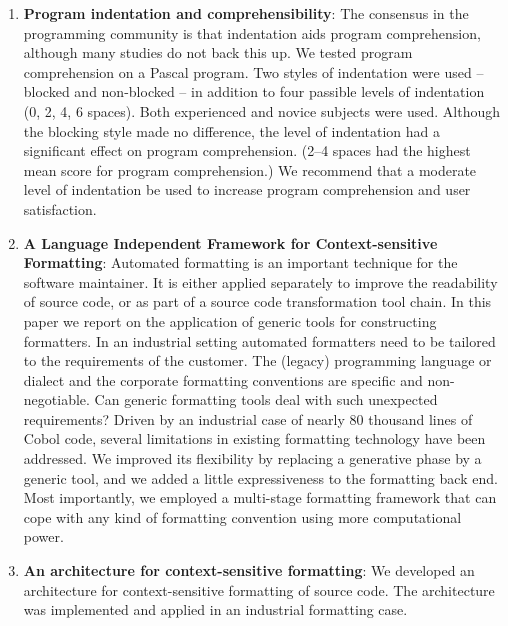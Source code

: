 \begin{englishtext}
\begin{enumerate}
    \item \textbf{Program indentation and comprehensibility}: The consensus in the
    programming community is that indentation aids program comprehension,
    although many studies do not back this up. We tested program comprehension
    on a Pascal program. Two styles of indentation were used -- blocked and
    non-blocked -- in addition to four passible levels of indentation
    (0, 2, 4, 6 spaces). Both experienced and novice subjects were used.
    Although the blocking style made no difference, the level of indentation had
    a significant effect on program comprehension. (2--4 spaces had the highest
    mean score for program comprehension.) We recommend that a moderate level
    of indentation be used to increase program comprehension and user
    satisfaction. \cite{programIndentation}

    \item \textbf{A Language Independent Framework for Context-sensitive
    Formatting}: Automated formatting is an important technique for the software
    maintainer. It is either applied separately to improve the readability of
    source code, or as part of a source code transformation tool chain. In this
    paper we report on the application of generic tools for constructing
    formatters. In an industrial setting automated formatters need to be
    tailored to the requirements of the customer. The (legacy) programming
    language or dialect and the corporate formatting conventions are specific
    and non-negotiable. Can generic formatting tools deal with such unexpected
    requirements? Driven by an industrial case of nearly 80 thousand lines of
    Cobol code, several limitations in existing formatting technology have been
    addressed. We improved its flexibility by replacing a generative phase by a
    generic tool, and we added a little expressiveness to the formatting back
    end. Most importantly, we employed a multi-stage formatting framework that
    can cope with any kind of formatting convention using more computational
    power. \cite{independentFramework}

    \item \textbf{An architecture for context-sensitive formatting}: We
    developed an architecture for context-sensitive formatting of source code.
    The architecture was implemented and applied in an industrial formatting
    case. \cite{architectureFormatting}


\end{enumerate}
\end{englishtext}
